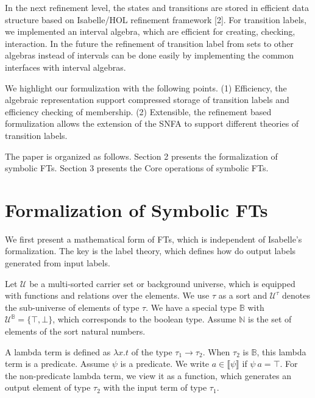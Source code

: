 \documentclass[a4paper,UKenglish,cleveref, autoref, thm-restate]{lipics-v2021}
\begin{document}
In the next refinement level, the states and transitions are stored in efficient data structure based on Isabelle/HOL refinement framework [2].
For transition labels, we implemented an interval algebra, which are efficient for creating, checking, interaction.
%
In the future the refinement of transition label from sets to other algebras instead of intervals can be done easily by implementing the common interfaces with interval algebras.

We highlight our formulization with the following points.
(1) Efficiency, the algebraic representation
support compressed storage of transition labels and efficiency checking
of membership.
(2) Extensible, the refinement based formulization allows the extension
of the SNFA to support different theories of transition labels.

The paper is organized as follows.
Section 2 presents the formalization of symbolic FTs.
Section 3 presents the Core operations of symbolic FTs.





\section{Formalization of Symbolic FTs}


We first present a mathematical form of FTs, which is independent of Isabelle's formalization. 
The key is the label theory, which defines how do output labels generated from input labels.

Let $\mathcal{U}$ be a multi-sorted carrier set or background universe, which is equipped with functions and relations over the elements. We use $\tau$ as a sort and $\mathcal{U}^\tau$ denotes the sub-universe of elements of type $\tau$. 
We have a special type $\mathbb{B}$ with $\mathcal{U}^\mathbb{B} = \{ \top, \bot\}$, which corresponds to the boolean type. Assume $\mathbb{N}$ is the set of elements of the sort natural numbers.

A lambda term is defined as $\lambda x. t$ of the type $\tau_1 \rightarrow \tau_2$.
When $\tau_2$ is $\mathbb{B}$, this lambda term is a predicate. Assume $\psi$ is a predicate. We write $a\in \llbracket\psi \rrbracket$ if $\psi~a=\top$. For the non-predicate lambda term, we view it as a function, which generates an output element of type $\tau_2$ with the input term of type $\tau_1$. 
\end{document}
